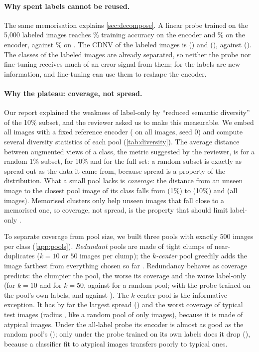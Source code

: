 \paragraph{Why spent labels cannot be reused.}
The same memorisation explains \cref{sec:decompose}. A linear probe trained on the 5,000 labeled images
reaches \supconProbeTrain\% training accuracy on the \supcon encoder and \unionProbeTrain\% on the \union
encoder, against \simclrProbeTrain\% on \simclr. The CDNV of the labeled images is \supconCdnvLab (\supcon) and
\unionCdnvLab (\union), against \simclrCdnvLab (\simclr). The classes of the labeled images are already
separated, so neither the probe nor fine-tuning receives much of an error signal from them; for \simclr the
labels are new information, and fine-tuning can use them to reshape the encoder.

\paragraph{Why the plateau: coverage, not spread.}
Our report explained the weakness of label-only \supcon by ``reduced semantic diversity'' of the 10\% subset,
and the reviewer asked us to make this measurable. We embed all images with a fixed reference encoder (\simclr
on all images, seed 0) and compute several diversity statistics of each pool (\cref{tab:diversity}).
The average distance between augmented views of a class, the metric suggested by the reviewer, is
\spreadOne for a random 1\% subset, \spreadTen for 10\% and \spreadFull for the full set: a random subset is
exactly as spread out as the data it came from, because spread is a property of the distribution. What a small
pool lacks is \emph{coverage}: the distance from an unseen image to the closest pool image of its class falls
from \radiusOne (1\%) to \radiusTen (10\%) and \radiusFull (all images). Memorised clusters only help unseen
images that fall close to a memorised one, so coverage, not spread, is the property that should limit
label-only \supcon.

To separate coverage from pool size, we built three pools with exactly 500 images per class (\cref{app:pools}).
\emph{Redundant} pools are made of tight clumps of near-duplicates ($k=10$ or $50$ images per clump); the
\emph{$k$-center} pool greedily adds the image farthest from everything chosen so far \citep{sener2018coreset}.
Redundancy behaves as coverage predicts: the clumpier the pool, the worse its coverage and the worse label-only
\supcon (\clTenAcc for $k=10$ and \clFiftyAcc for $k=50$, against \supconLin for a random pool; with the probe
trained on the pool's own labels, \clTenLabAcc and \clFiftyLabAcc against \supconLabAcc). The $k$-center pool is
the informative exception. It has by far the largest spread (\spreadKc) and the worst coverage of typical test
images (radius \radiusKc, like a random pool of only \neffKc images), because it is made of atypical images.
Under the all-label probe its \supcon encoder is almost as good as the random pool's (\kcAcc); only under the
probe trained on its own labels does it drop (\kcLabAcc), because a classifier fit to atypical images transfers
poorly to typical ones.

